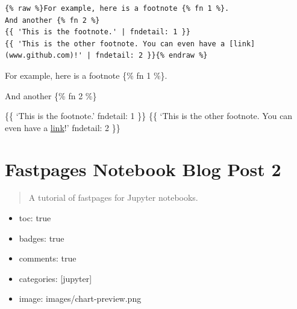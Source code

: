 \documentclass[11pt]{article}
\providecommand{\tightlist}{%
      \setlength{\itemsep}{0pt}\setlength{\parskip}{0pt}}
\begin{document}
\begin{verbatim}
{% raw %}For example, here is a footnote {% fn 1 %}.
And another {% fn 2 %}
{{ 'This is the footnote.' | fndetail: 1 }}
{{ 'This is the other footnote. You can even have a [link](www.github.com)!' | fndetail: 2 }}{% endraw %}
\end{verbatim}

For example, here is a footnote \{\% fn 1 \%\}.

And another \{\% fn 2 \%\}

\{\{ `This is the footnote.' \textbar{} fndetail: 1 \}\} \{\{ `This is
the other footnote. You can even have a \href{www.github.com}{link}!'
\textbar{} fndetail: 2 \}\}

    \hypertarget{fastpages-notebook-blog-post-2}{%
\section{Fastpages Notebook Blog Post
2}\label{fastpages-notebook-blog-post-2}}
\label{sec:02-ttest}
    \begin{quote}
A tutorial of fastpages for Jupyter notebooks.
\end{quote}

\begin{itemize}
\tightlist
\item
  toc: true
\item
  badges: true
\item
  comments: true
\item
  categories: {[}jupyter{]}
\item
  image: images/chart-preview.png
\end{itemize}


    
    
    
\end{document}
